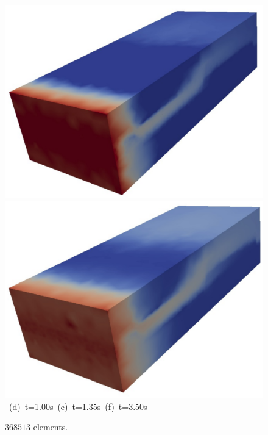 \begin{landscape}
\begin{figure}[ht]
{{            \includegraphics[width=.5\textwidth]{./Pics1/3D_Channel/3D_channel_sat_150.pdf}
            \includegraphics[width=.5\textwidth]{./Pics1/3D_Channel/3D_channel_sat_490.pdf} }
      \hbox{\hspace{2.cm} (d) t=1.00s \hspace{5.cm} (e) t=1.35s\hspace{4.cm} (f) t=3.50s  } }
\caption{$368513$ elements.}
\label{fig:3DChannel_sat}
\end{figure}
\end{landscape}
\clearpage



